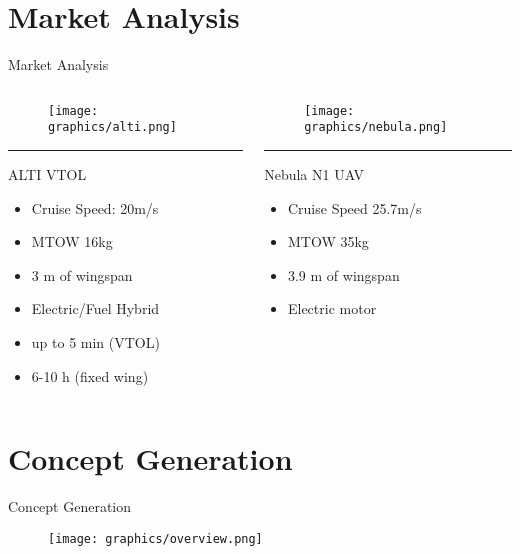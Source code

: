 \section{Market Analysis}
\begin{frame}{Market Analysis}
    \begin{columns}[T] %
        \begin{column}{.48\textwidth}
        \begin{figure}
	    \texttt{[image: graphics/alti.png]}
        \end{figure}
        \color{black}\rule{\linewidth}{1pt}
        ALTI VTOL \cite{Alti}
        \begin{itemize}
            \item Cruise Speed: 20m/s
            \item MTOW 16kg
            \item 3 m of wingspan
            \item Electric/Fuel Hybrid
            \item up to 5 min (VTOL)
            \item 6-10 h (fixed wing)
        \end{itemize}
        \end{column}%
        \hfill%
        \begin{column}{.48\textwidth}
        \begin{figure}
	    \texttt{[image: graphics/nebula.png]}
        \end{figure}
        \color{black}\rule{\linewidth}{1pt}
        Nebula N1 UAV
        \begin{itemize}
            \item Cruise Speed 25.7m/s
            \item MTOW 35kg
            \item 3.9 m of wingspan
            \item Electric motor
        \end{itemize}
        \end{column}%
    \end{columns}
\end{frame}
\section{Concept Generation}
\begin{frame}{Concept Generation}
    \begin{figure}
        \texttt{[image: graphics/overview.png]}
    \end{figure}   
\end{frame}

